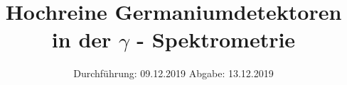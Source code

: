 
\usepackage{longtable}
\usepackage{wrapfig}
\usepackage{ dsfont }
\subject{VERSUCH 18}
\title{Hochreine Germaniumdetektoren in der \texorpdfstring{$\gamma$}. - Spektrometrie}
\date{%
  \hspace{-2.5em}
  Durchführung: 09.12.2019
  \hspace{4em}
  Abgabe: 13.12.2019
}


  \setlength{\parindent}{0em}
  \maketitle
  \thispagestyle{empty}
  \newpage
  \tableofcontents
  \newpage




%
\printbibliography{}
%


